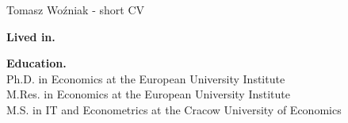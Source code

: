 \documentclass[notes,blackandwhite,mathsans]{beamer}
\begin{document}
\begin{frame}{Tomasz Wo\'zniak - short CV}

\textbf{Lived in.}\\

\vspace{1cm}\textbf{Education.}\\
{\small {\color{mcxs3}Ph.D. in} {\color{mcxs2} Economics} {\color{mcxs3} at the }European University Institute\\
{\color{mcxs3}M.Res. in Economics at the }European University Institute \\
{\color{mcxs3}M.S. in }IT and Econometrics {\color{mcxs3} at the} {\color{mcxs2} Cracow University of Economics} \\}


\end{frame}
\end{document}
